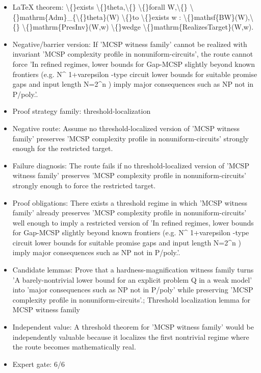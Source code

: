 \documentclass[11pt]{article}
\begin{document}
\begin{itemize}
\item LaTeX theorem: \textbackslash\{\}exists \textbackslash\{\}theta,\textbackslash\{\} \textbackslash\{\}forall W,\textbackslash\{\} \textbackslash\{\}mathrm\{Adm\}\_\{\textbackslash\{\}theta\}(W) \textbackslash\{\}to \textbackslash\{\}exists w : \textbackslash\{\}mathsf\{BW\}(W),\textbackslash\{\} \textbackslash\{\}mathrm\{PresInv\}(W,w) \textbackslash\{\}wedge \textbackslash\{\}mathrm\{RealizesTarget\}(W,w).
\item Negative/barrier version: If 'MCSP witness family' cannot be realized with invariant 'MCSP complexity profile in nonuniform-circuits', the route cannot force 'In refined regimes, lower bounds for Gap-MCSP slightly beyond known frontiers (e.g. N\textasciicircum{} 1+varepsilon -type circuit lower bounds for suitable promise gaps and input length N=2\textasciicircum{}n ) imply major consequences such as NP not in P/poly.'.
\item Proof strategy family: threshold-localization
\item Negative route: Assume no threshold-localized version of 'MCSP witness family' preserves 'MCSP complexity profile in nonuniform-circuits' strongly enough for the restricted target.
\item Failure diagnosis: The route fails if no threshold-localized version of 'MCSP witness family' preserves 'MCSP complexity profile in nonuniform-circuits' strongly enough to force the restricted target.
\item Proof obligations: There exists a threshold regime in which 'MCSP witness family' already preserves 'MCSP complexity profile in nonuniform-circuits' well enough to imply a restricted version of 'In refined regimes, lower bounds for Gap-MCSP slightly beyond known frontiers (e.g. N\textasciicircum{} 1+varepsilon -type circuit lower bounds for suitable promise gaps and input length N=2\textasciicircum{}n ) imply major consequences such as NP not in P/poly.'.
\item Candidate lemmas: Prove that a hardness-magnification witness family turns 'A barely-nontrivial lower bound for an explicit problem Q in a weak model' into 'major consequences such as NP not in P/poly' while preserving 'MCSP complexity profile in nonuniform-circuits'.; Threshold localization lemma for MCSP witness family
\item Independent value: A threshold theorem for 'MCSP witness family' would be independently valuable because it localizes the first nontrivial regime where the route becomes mathematically real.
\item Expert gate: 6/6
\end{itemize}
\end{document}
